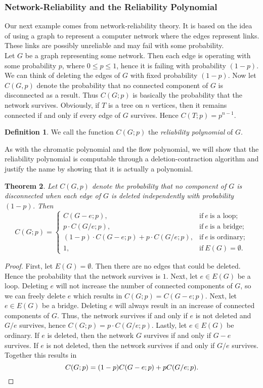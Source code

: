 \documentclass[12pt,a4paper, twoside, autooneside=false]{scrartcl}
\newtheorem{theorem}{Theorem}[section]
\theoremstyle{definition}
\newtheorem{definition}[theorem]{Definition}
\theoremstyle{remark}
\numberwithin{equation}{section}
\begin{document}
\subsubsection{Network-Reliability and the Reliability Polynomial}
Our next example comes from network-reliability theory. It is based on the idea of using a graph to represent a computer network where the edges represent links. These links are possibly unreliable and may fail with some probability. \\
Let $G$ be a graph representing some network. Then each edge is operating with some probability $p$, where $0 \leq p \leq 1$, hence it is failing with probability $(1 - p)$. We can think of deleting the edges of $G$ with fixed probability $(1 - p)$. Now let $C(G,p)$ denote the probability that no connected component of $G$ is disconnected as a result. Thus $C(G;p)$ is basically the probability that the network survives. Obviously, if $T$ is a tree on $n$ vertices, then it remains connected if and only if every edge of $G$ survives. Hence $C(T;p) =  p^{n - 1}$.
\begin{definition}
We call the function $C(G;p)$ the \textit{reliability polynomial} of $G$. 
\end{definition}
As with the chromatic polynomial and the flow polynomial, we will show that the reliability polynomial is computable through a deletion-contraction algorithm and justify the name by showing that it is actually a polynomial. 
\begin{theorem}
Let $C(G,p)$ denote the probability that no component of $G$ is disconnected when each edge of $G$ is deleted independently with probability $(1-p)$. Then 
\[
C(G;p) = 
\begin{cases}
C(G - e; p), &  \text{if} \ e \ \text{is a loop}; \\
p \cdot C(G / e; p),&  \text{if} \ e \ \text{is a bridge}; \\
(1 - p)\cdot C(G - e; p) + p \cdot C(G / e; p),&  \text{if} \ e \ \text{is ordinary}; \\
1, & \text{if} \ E(G) = \emptyset.
\end{cases}
\]
\end{theorem}
\begin{proof}
First, let $E(G) = \emptyset$. Then there are no edges that could be deleted. Hence the probability that the network survives is $1$. Next, let $e \in E(G)$ be a loop. Deleting $e$ will not increase the number of connected components of $G$, so we can freely delete $e$ which results in $C(G;p) = C(G - e;p)$. Next, let $e \in E(G)$ be a bridge. Deleting $e$ will always result in an increase of connected components of $G$. Thus, the network survives if and only if $e$ is not deleted and $G/e$ survives, hence $C(G;p) = p \cdot C(G/e;p)$. Lastly, let $e \in E(G)$ be ordinary. If $e$ is deleted, then the network $G$ survives if and only if $G - e$ survives. If $e$ is not deleted, then the network survives if and only if $G / e$ survives. Together this results in
\[
C(G;p) = (1-p)C(G - e;p) + pC(G/e;p). \qedhere
\]
\end{proof}
\end{document}
